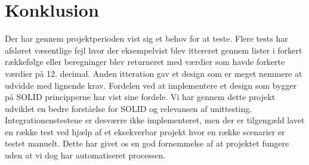 \thispagestyle{fancy}
\chapter{Konklusion}
\label{chp:Konklusion}
Der har gennem projektperioden vist sig et behov for at teste. Flere tests har afsløret væsentlige fejl hvor der eksempelvist blev ittereret gennem lister i forkert rækkefølge eller beregninger blev returneret med værdier som havde forkerte værdier på 12. decimal. Anden itteration gav et design som er meget nemmere at udvidde med lignende krav. Fordelen ved at implementere et design som bygger på SOLID principperne har vist sine fordele. Vi har gennem dette projekt udviklet en bedre forståelse for SOLID og relevansen af unittesting. Integrationenstestene er desværre ikke implementeret, men der er tilgengæld lavet en række test ved hjælp af et eksekverbar projekt hvor en række scenarier er testet manuelt. Dette har givet os en god fornemmelse af at projektet fungere uden at vi dog har automatiseret processen.

%
%
